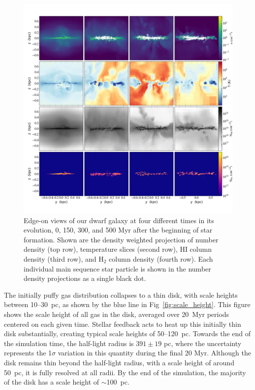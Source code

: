 \documentclass[fleqn,usenatbib,useAMS]{mnras}
\begin{document}
\begin{figure}
\centering
\includegraphics[width=0.975\linewidth]{multiplot_4x4_x.png}
\caption{Edge-on views of our dwarf galaxy at four different times in its evolution, 0, 150, 300, and 500 Myr after the beginning of star formation. Shown are the density weighted projection of number density (top row), temperature slices (second row), HI column density (third row), and H$_2$ column density (fourth row). Each individual main sequence star particle is shown in the number density projections as a single black dot.}
\label{fig:panel_x}
\end{figure}

The initially puffy gas distribution collapses to a thin disk, with scale heights between 10--30~pc, as shown by the blue line in Fig~\ref{fig:scale_height}. This figure shows the scale height of all gas in the disk, averaged over 20~Myr periods centered on each given time. Stellar feedback acts to heat up this initially thin disk substantially, creating typical scale heights of 50--120~pc. Towards the end of the simulation time, the half-light radius is $391 \pm 19$ pc, where the uncertainty represents the 1$\sigma$ variation in this quantity during the final 20 Myr. Although the disk remains thin beyond the half-light radius, with a scale height of around 50~pc, it is fully resolved at all radii. By the end of the simulation, the majority of the disk has a scale height of $\sim$100~pc. 
\end{document}
